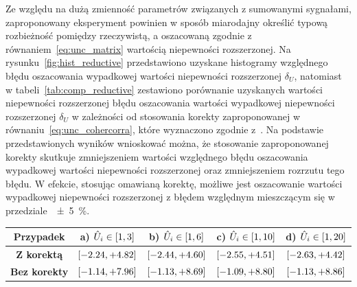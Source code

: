 Ze względu na dużą zmienność parametrów związanych z sumowanymi sygnałami, zaproponowany eksperyment powinien w sposób miarodajny określić typową rozbieżność pomiędzy rzeczywistą, a oszacowaną zgodnie z równaniem~\eqref{eq:unc_matrix} wartością niepewności rozszerzonej. Na rysunku~\ref{fig:hist_reductive} przedstawiono uzyskane histogramy względnego błędu oszacowania wypadkowej wartości niepewności rozszerzonej $\delta_{U}$, natomiast w tabeli~\ref{tab:comp_reductive} zestawiono porównanie uzyskanych wartości niepewności rozszerzonej błędu oszacowania wartości wypadkowej niepewności rozszerzonej $\delta_{U}$ w zależności od stosowania korekty zaproponowanej w równaniu~\eqref{eq:unc_cohercorra}, które wyznaczono zgodnie z~\cite{jcgm_guide, jcgm_montecarlo}. Na podstawie przedstawionych wyników wnioskować można, że stosowanie zaproponowanej korekty skutkuje zmniejszeniem wartości względnego błędu oszacowania wypadkowej wartości niepewności rozszerzonej oraz zmniejszeniem rozrzutu tego błędu. W efekcie, stosując omawianą korektę, możliwe jest oszacowanie wartości wypadkowej niepewności rozszerzonej z błędem względnym mieszczącym się w przedziale~\qty{\pm 5}{\percent}.

\begin{table}[htb!]
\begin{center}
\begin{tabular}[c]{| c | c | c | c | c |} \hline
\textbf{Przypadek}   & \textbf{a) $\hat{U}_{i} \in \interval{1}{3}$} & \textbf{b) $\hat{U}_{i} \in \interval{1}{6}$} & \textbf{c) $\hat{U}_{i} \in \interval{1}{10}$} & \textbf{d) $\hat{U}_{i} \in \interval{1}{20}$} \\ \hline
\textbf{Z korektą}   & $\interval{-2.24}{+4.82}$ & $\interval{-2.44}{+4.60}$ & $\interval{-2.55}{+4.51}$ & $\interval{-2.63}{+4.42}$ \\ \hline
\textbf{Bez korekty} & $\interval{-1.14}{+7.96}$ & $\interval{-1.13}{+8.69}$ & $\interval{-1.09}{+8.80}$ & $\interval{-1.13}{+8.86}$ \\ \hline
\end{tabular}
\end{center}
\end{table}

